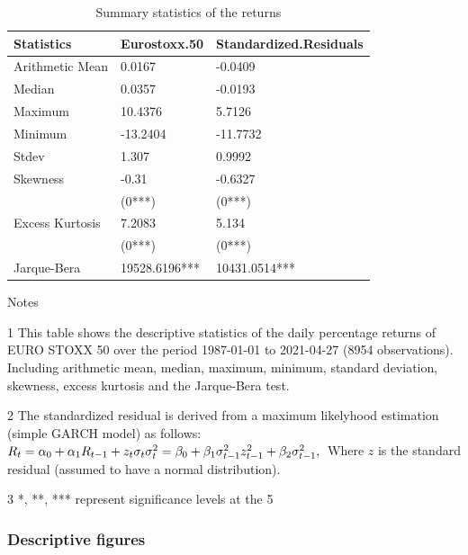 \documentclass[a4paper, twoside]{templates/ociamthesis}
\begin{document}
\begin{table}[h!]

\caption{\label{tab:dsTable}Summary statistics of the returns}
\centering
\begin{threeparttable}
\begin{tabular}[t]{lll}
\toprule
Statistics & Eurostoxx.50 & Standardized.Residuals\\
\midrule
Arithmetic Mean & 0.0167 & -0.0409\\
Median & 0.0357 & -0.0193\\
Maximum & 10.4376 & 5.7126\\
Minimum & -13.2404 & -11.7732\\
Stdev & 1.307 & 0.9992\\
\addlinespace
Skewness & -0.31 & -0.6327\\
 & (0***) & (0***)\\
Excess Kurtosis & 7.2083 & 5.134\\
 & (0***) & (0***)\\
Jarque-Bera & 19528.6196*** & 10431.0514***\\
\bottomrule
\end{tabular}
\begin{tablenotes}
\item Notes
\item[1] This table shows the descriptive statistics of the daily percentage returns of EURO STOXX 50 over the period 1987-01-01 to 2021-04-27 (8954 observations). Including arithmetic mean, median, maximum, minimum, standard deviation, skewness, excess kurtosis and the Jarque-Bera test.
\item[2] The standardized residual is derived from a maximum likelyhood estimation (simple GARCH model) as follows:  $ R_t=\alpha_0+\alpha_1 R_{t-1}+z_t \sigma_t \\ \sigma_t^2=\beta_0+\beta_1 \sigma_{t-1}^2 z_{t-1}^2+\beta_2 \sigma_{t-1}^2, \\$ Where $z$ is the standard residual (assumed to have a normal distribution).
\item[3] *, **, *** represent significance levels at the 5%
\end{tablenotes}
\end{threeparttable}
\end{table}

\newpage
\clearpage

\hypertarget{descriptive-figures}{%
\subsubsection{Descriptive figures}\label{descriptive-figures}}
\end{document}
